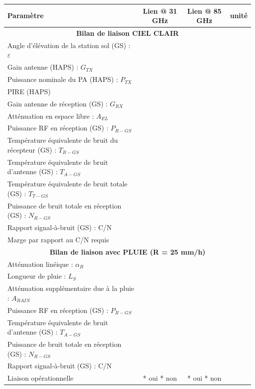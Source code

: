 \documentclass[a4paper,11pt]{article}
\begin{document}
\begin{table}[h]
\centering
\begin{tabular}{lccl}
\toprule
\textbf{Paramètre} & \textbf{Lien @ 31 GHz} & \textbf{Lien @ 85 GHz} & \textbf{unité} \\
\midrule
\multicolumn{4}{c}{\textbf{Bilan de liaison CIEL CLAIR}} \\
\midrule
Angle d'élévation de la station sol (GS) : $\varepsilon$ & & & \\
Gain antenne (HAPS) : $G_{TX}$ & & & \\
Puissance nominale du PA (HAPS) : $P_{TX}$ & & & \\
PIRE (HAPS) & & & \\
Gain antenne de réception (GS) : $G_{RX}$ & & & \\
Atténuation en espace libre : $A_{EL}$ & & & \\
Puissance RF en réception (GS) : $P_{R-GS}$ & & & \\
Température équivalente de bruit du récepteur (GS) : $T_{R-GS}$ & & & \\
Température équivalente de bruit d'antenne (GS) : $T_{A-GS}$ & & & \\
Température équivalente de bruit totale (GS) : $T_{T-GS}$ & & & \\
Puissance de bruit totale en réception (GS) : $N_{R-GS}$ & & & \\
Rapport signal-à-bruit (GS) : C/N & & & \\
Marge par rapport au C/N requis & & & \\
\midrule
\multicolumn{4}{c}{\textbf{Bilan de liaison avec PLUIE (R = 25 mm/h)}} \\
\midrule
Atténuation linéique : $\alpha_R$ & & & \\
Longueur de pluie : $L_S$ & & & \\
Atténuation supplémentaire due à la pluie : $A_{RAIN}$ & & & \\
Puissance RF en réception (GS) : $P_{R-GS}$ & & & \\
Température équivalente de bruit d'antenne (GS) : $T_{A-GS}$ & & & \\
Puissance de bruit totale en réception (GS) : $N_{R-GS}$ & & & \\
Rapport signal-à-bruit (GS) : C/N & & & \\
Liaison opérationnelle & * oui * non & * oui * non & \\
\bottomrule
\end{tabular}
\end{table}
\end{document}
